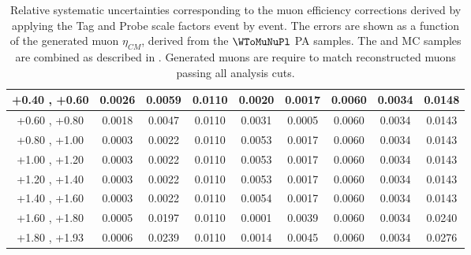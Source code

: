 \begin{table}[h!]
{\begin{tabular}{|c|*8c|}
    \hline
    +0.40 , +0.60 & 0.0026 & 0.0059 & 0.0110 & 0.0020 & 0.0017 & 0.0060 & 0.0034 & 0.0148\\
    \hline
    +0.60 , +0.80 & 0.0018 & 0.0047 & 0.0110 & 0.0031 & 0.0005 & 0.0060 & 0.0034 & 0.0143\\
    \hline
    +0.80 , +1.00 & 0.0003 & 0.0022 & 0.0110 & 0.0053 & 0.0017 & 0.0060 & 0.0034 & 0.0143\\
    \hline
    +1.00 , +1.20 & 0.0003 & 0.0022 & 0.0110 & 0.0053 & 0.0017 & 0.0060 & 0.0034 & 0.0143\\
    \hline
    +1.20 , +1.40 & 0.0003 & 0.0022 & 0.0110 & 0.0053 & 0.0017 & 0.0060 & 0.0034 & 0.0143\\
    \hline
    +1.40 , +1.60 & 0.0003 & 0.0022 & 0.0110 & 0.0054 & 0.0017 & 0.0060 & 0.0034 & 0.0143\\
    \hline
    +1.60 , +1.80 & 0.0005 & 0.0197 & 0.0110 & 0.0001 & 0.0039 & 0.0060 & 0.0034 & 0.0240\\
    \hline
    +1.80 , +1.93 & 0.0006 & 0.0239 & 0.0110 & 0.0014 & 0.0045 & 0.0060 & 0.0034 & 0.0276\\
    \hline
  \end{tabular}
  }
  \caption{Relative systematic uncertainties corresponding to the muon efficiency corrections derived by applying the Tag and Probe scale factors event by event. The errors are shown as a function of the generated muon $\eta_{CM}$, derived from the $\WToMuNuPl$ PA \POWHEG samples. The \pPb and \Pbp MC samples are combined as described in . Generated muons are require to match reconstructed muons passing all analysis cuts.}
  \label{tab:tnpSystUncertainty_WToMu_Plus_PA}
\end{table}


